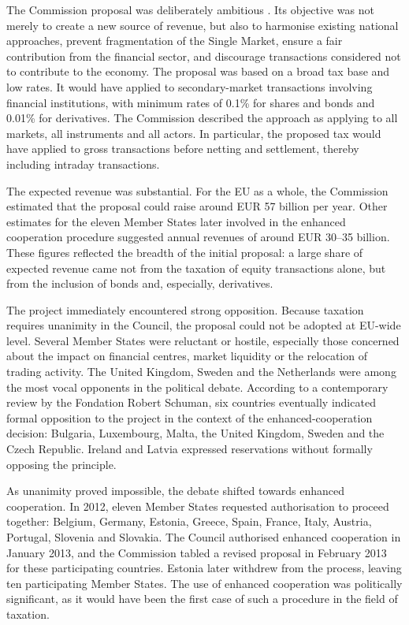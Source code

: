 \documentclass[../../main]{subfiles}
\begin{document}
The Commission proposal was deliberately ambitious \citep{Gabor2016}. Its objective was not merely to create a new source of revenue, but also to harmonise existing national approaches, prevent fragmentation of the Single Market, ensure a fair contribution from the financial sector, and discourage transactions considered not to contribute to the economy. The proposal was based on a broad tax base and low rates. It would have applied to secondary-market transactions involving financial institutions, with minimum rates of 0.1\% for shares and bonds and 0.01\% for derivatives. The Commission described the approach as applying to all markets, all instruments and all actors. In particular, the proposed tax would have applied to gross transactions before netting and settlement, thereby including intraday transactions.

The expected revenue was substantial. For the EU as a whole, the Commission estimated that the proposal could raise around EUR 57 billion per year. Other estimates for the eleven Member States later involved in the enhanced cooperation procedure suggested annual revenues of around EUR 30--35 billion. These figures reflected the breadth of the initial proposal: a large share of expected revenue came not from the taxation of equity transactions alone, but from the inclusion of bonds and, especially, derivatives.

The project immediately encountered strong opposition. Because taxation requires unanimity in the Council, the proposal could not be adopted at EU-wide level. Several Member States were reluctant or hostile, especially those concerned about the impact on financial centres, market liquidity or the relocation of trading activity. The United Kingdom, Sweden and the Netherlands were among the most vocal opponents in the political debate. According to a contemporary review by the Fondation Robert Schuman, six countries eventually indicated formal opposition to the project in the context of the enhanced-cooperation decision: Bulgaria, Luxembourg, Malta, the United Kingdom, Sweden and the Czech Republic. Ireland and Latvia expressed reservations without formally opposing the principle.

As unanimity proved impossible, the debate shifted towards enhanced cooperation. In 2012, eleven Member States requested authorisation to proceed together: Belgium, Germany, Estonia, Greece, Spain, France, Italy, Austria, Portugal, Slovenia and Slovakia. The Council authorised enhanced cooperation in January 2013, and the Commission tabled a revised proposal in February 2013 for these participating countries. Estonia later withdrew from the process, leaving ten participating Member States. The use of enhanced cooperation was politically significant, as it would have been the first case of such a procedure in the field of taxation.
\end{document}
